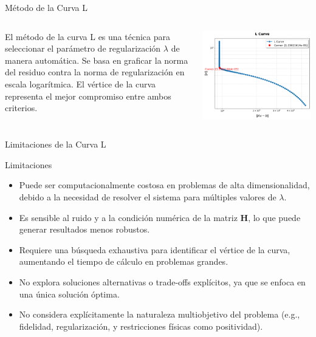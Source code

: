 \documentclass[aspectratio=169,xcolor=dvipsnames]{beamer}
\begin{document}
\begin{frame}{Método de la Curva L}
    \begin{columns}
        El método de la curva L es una técnica para seleccionar el parámetro de regularización $\lambda$ de manera automática. Se basa en graficar la norma del residuo contra la norma de regularización en escala logarítmica. El vértice de la curva representa el mejor compromiso entre ambos criterios.

        \centering
        \includegraphics[width=\textwidth]{img/L_curve.png} %
    \end{columns}
\end{frame}

\begin{frame}{Limitaciones de la Curva L}
    \begin{alertblock}{Limitaciones}
        \begin{itemize}
            \item Puede ser computacionalmente costosa en problemas de alta dimensionalidad, debido a la necesidad de resolver el sistema para múltiples valores de \(\lambda\).
            \item Es sensible al ruido y a la condición numérica de la matriz \(\mathbf{H}\), lo que puede generar resultados menos robustos.
            \item Requiere una búsqueda exhaustiva para identificar el vértice de la curva, aumentando el tiempo de cálculo en problemas grandes.
            \item No explora soluciones alternativas o trade-offs explícitos, ya que se enfoca en una única solución óptima.
            \item No considera explícitamente la naturaleza multiobjetivo del problema (e.g., fidelidad, regularización, y restricciones físicas como positividad).
        \end{itemize}
    \end{alertblock}
\end{frame}
\end{document}
